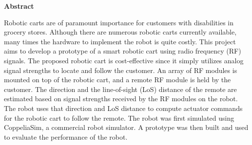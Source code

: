 
\begin{center}\textbf{Abstract}\end{center}

Robotic carts are of paramount importance for customers with disabilities in grocery stores. Although there are numerous robotic carts currently available, many times the hardware to implement the robot is quite costly. This project aims to develop a prototype of a smart robotic cart using radio frequency (RF) signals. The proposed robotic cart is cost-effective since it simply utilizes analog signal strengths to locate and follow the customer. An array of RF modules is mounted on top of the robotic cart, and a remote RF module is held by the customer. The direction and the line-of-sight (LoS) distance of the remote are estimated based on signal strengths received by the RF modules on the robot. The robot uses that direction and LoS distance to compute actuator commands for the robotic cart to follow the remote.  The robot was first simulated using CoppeliaSim, a commercial robot simulator. A prototype was then built and used to evaluate the performance of the robot.

\cleardoublepage


